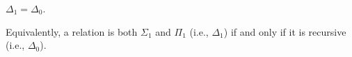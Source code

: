 $\Delta_1 = \Delta_0$.

Equivalently, a relation is both $\Sigma_1$ and $\Pi_1$ (i.e., $\Delta_1$) if and only if it is recursive (i.e., $\Delta_0$).
